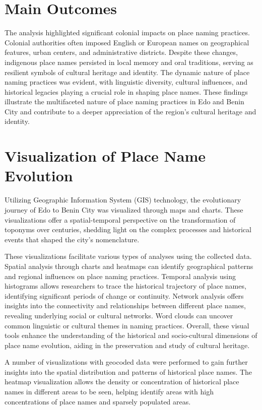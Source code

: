 \section{Main Outcomes}

The analysis highlighted significant colonial impacts on place naming practices. Colonial authorities often imposed English or European names on geographical features, urban centers, and administrative districts. Despite these changes, indigenous place names persisted in local memory and oral traditions, serving as resilient symbols of cultural heritage and identity. The dynamic nature of place naming practices was evident, with linguistic diversity, cultural influences, and historical legacies playing a crucial role in shaping place names. These findings illustrate the multifaceted nature of place naming practices in Edo and Benin City and contribute to a deeper appreciation of the region's cultural heritage and identity.

\section{Visualization of Place Name Evolution}

Utilizing Geographic Information System (GIS) technology, the evolutionary journey of Edo to Benin City was visualized through maps and charts. These visualizations offer a spatial-temporal perspective on the transformation of toponyms over centuries, shedding light on the complex processes and historical events that shaped the city's nomenclature.

These visualizations facilitate various types of analyses using the collected data. Spatial analysis through charts and heatmaps can identify geographical patterns and regional influences on place naming practices. Temporal analysis using histograms allows researchers to trace the historical trajectory of place names, identifying significant periods of change or continuity. Network analysis offers insights into the connectivity and relationships between different place names, revealing underlying social or cultural networks. Word clouds can uncover common linguistic or cultural themes in naming practices. Overall, these visual tools enhance the understanding of the historical and socio-cultural dimensions of place name evolution, aiding in the preservation and study of cultural heritage.

A number of visualizations with geocoded data were performed to gain further insights into the spatial distribution and patterns of historical place names. The heatmap visualization allows the density or concentration of historical place names in different areas to be seen, helping identify areas with high concentrations of place names and sparsely populated areas.



